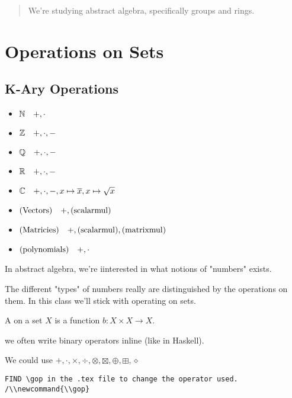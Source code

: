 \documentclass[12pt]{article}
\newcommand{\gop}[0]{\boxtimes}
\begin{document}
\maketitle 

\begin{abstract}
  We're studying abstract algebra, specifically groups and rings.
\end{abstract}

\tableofcontents

\pagebreak

\section{Operations on Sets}
\subsection{K-Ary Operations}

\begin{itemize}
  \item \(\mathbb N\quad +,\cdot\)
  \item \(\mathbb Z\quad +,\cdot,-\)
  \item \(\mathbb Q\quad +,\cdot,-\)
  \item \(\mathbb R\quad +,\cdot,-\)
  \item \(\mathbb C\quad +,\cdot,-,x\mapsto\overline x,x\mapsto\sqrt x\)
  \item \((\mathrm{Vectors})\quad +,(\mathrm{scalar mul})\)
  \item \((\mathrm{Matricies})\quad +,(\mathrm{scalar mul}),(\mathrm{matrix mul})\)
  \item \((\mathrm{polynomials})\quad +,\cdot\)
\end{itemize}

In abstract algebra, we're iinterested in what notions of "numbers" exists.

The different "types" of numbers really are distinguished by the operations on
them. In this class we'll stick with operating on sets.

\bbox
\begin{defn}
  A  on a set \(X\) is a function \(b:X\times X\to X\).
\end{defn}
\ebox
\bboxnote
{} we often write binary operators inline (like in Haskell).
\ebox

We could use \(+,\cdot,\times,\div,\otimes,\boxtimes,\oplus,\boxplus,\diamond\)
\begin{verbatim}
FIND \gop in the .tex file to change the operator used. 
/\\newcommand{\\gop}
\end{verbatim}
\end{document}
